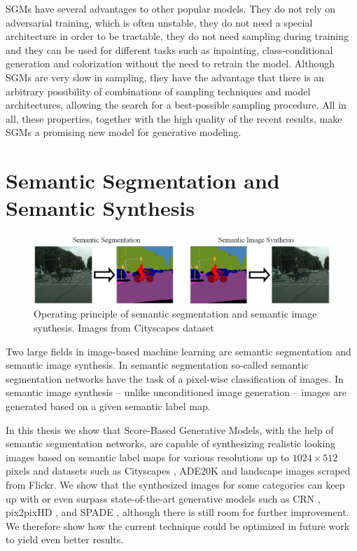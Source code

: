 \thispagestyle{plain}
SGMs have several advantages to other popular models. They do not rely on adversarial training, which is often unstable, they do not need a special architecture in order to be tractable, they do not need sampling during training and they can be used for different tasks such as inpainting, class-conditional generation and colorization without the need to retrain the model. Although SGMs are very slow in sampling, they have the advantage that there is an arbitrary possibility of combinations of sampling techniques and model architectures, allowing the search for a best-possible sampling procedure. All in all, these properties, together with the high quality of the recent results, make SGMs a promising new model for generative modeling.
\section{Semantic Segmentation and Semantic Synthesis} 
\thispagestyle{plain}
%
\begin{figure}[h!]
    \centering
    \includegraphics[width=1\textwidth]{Chapters/figures/sem_seg_vs_sem_synth.PNG}
    \caption[Operating principle of semantic segmentation and semantic image synthesis]{Operating principle of semantic segmentation and semantic image synthesis. Images from Cityscapes dataset \cite{cityscapes}}
\end{figure}
%
Two large fields in image-based machine learning are semantic segmentation and semantic image synthesis. In semantic segmentation so-called semantic segmentation networks have the task of a pixel-wise classification of images. In semantic image synthesis – unlike unconditioned image generation \cite{score_3} – images are generated based on a given semantic label map.

In this thesis we show that Score-Based Generative Models, with the help of semantic segmentation networks, are capable of synthesizing realistic looking images based on semantic label maps for various resolutions up to $1024\times512$ pixels and datasets such as Cityscapes \cite{cityscapes}, ADE20K \cite{ade20k} and landscape images scraped from Flickr. We show that the synthesized images for some categories can keep up with or even surpass state-of-the-art generative models such as CRN \cite{crn}, pix2pixHD \cite{pix2pixHD}, and SPADE \cite{spade}, although there is still room for further improvement. We therefore show how the current technique could be optimized in future work to yield even better results. 

